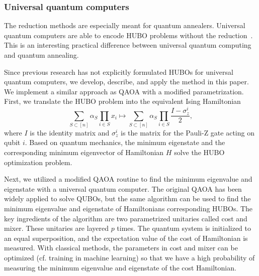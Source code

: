\subsubsection{Universal quantum computers}

The reduction methods are especially meant for quantum annealers. Universal quantum computers are able to encode HUBO problems without the reduction~\cite{10313783, 10.1145/3478519}. This is an interesting practical difference between universal quantum computing and quantum annealing.

Since previous research has not explicitly formulated HUBOs for universal quantum computers, we develop, describe, and apply the method in this paper. We implement a similar approach as QAOA with a modified parametrization. First, we translate the HUBO problem into the equivalent Ising Hamiltonian
\begin{equation}\label{eq:hubo_to_hamiltonian}
    \sum_{S \subset [n]}\alpha_{S}\prod_{i \in S}x_i \mapsto \sum_{S \subset [n]}\alpha_{S}\prod_{i \in S}\frac{I - \sigma_{z}^{i}}{2},
\end{equation}
where $I$ is the identity matrix and $\sigma_{z}^{i}$ is the matrix for the Pauli-Z gate acting on qubit $i$. Based on quantum mechanics, the minimum eigenstate and the corresponding minimum eigenvector of Hamiltonian $H$ solve the HUBO optimization problem. 

Next, we utilized a modified QAOA routine to find the minimum eigenvalue and eigenstate with a universal quantum computer. The original QAOA \cite{farhi2014quantum} has been widely applied to solve QUBOs, but the same algorithm can be used to find the minimum eigenvalue and eigenstate of Hamiltonians corresponding HUBOs. The key ingredients of the algorithm are two parametrized unitaries called cost and mixer. These unitaries are layered $p$ times. The quantum system is initialized to an equal superposition, and the expectation value of the cost of Hamiltonian is measured. With classical methods, the parameters in cost and mixer can be optimized (cf. training in machine learning) so that we have a high probability of measuring the minimum eigenvalue and eigenstate of the cost Hamiltonian.

